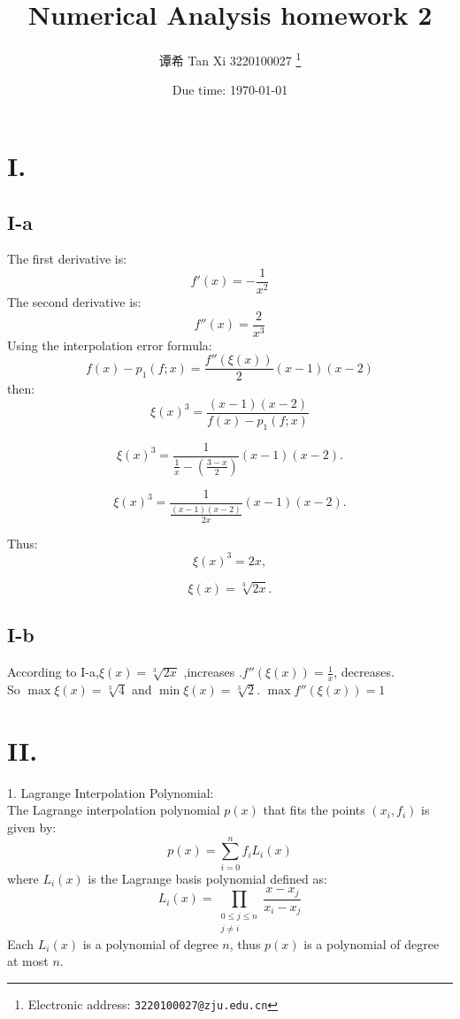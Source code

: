 \documentclass[a4paper]{article}
\begin{document}
\title{Numerical Analysis homework 2}

\author{谭希 Tan Xi 3220100027
  \thanks{Electronic address: \texttt{3220100027@zju.edu.cn}}}


\date{Due time: \today}

\maketitle

\section*{I. }
\subsection*{I-a}
The first derivative is:
\[f'(x) = -\frac{1}{x^2}\]
The second derivative is:
\[f''(x) = \frac{2}{x^3}\]
Using the interpolation error formula:
\[f(x) - p_1(f; x) = \frac{f''(\xi(x))}{2} (x - 1)(x - 2)\]
then:
\[\xi(x)^3 = \frac{(x - 1)(x - 2)}{f(x) - p_1(f; x)}\]

\[\xi(x)^3 = \frac{1}{\frac{1}{x} - \left(\frac{3 - x}{2}\right)}(x - 1)(x - 2).\]

\[\xi(x)^3 = \frac{1}{\frac{(x - 1)(x - 2)}{2x}}(x - 1)(x - 2).\]

Thus:
\[\xi(x)^3 = 2x,\]

\[\xi(x) = \sqrt[3]{2x}.\]

\subsection*{I-b}
According to I-a,$\xi(x)=\sqrt[3]{2x}$ ,increases .$f''(\xi(x))=\frac{1}{x}$, decreases.\\
So $\max\xi(x)=\sqrt[3]{4}$ and $\min\xi(x)=\sqrt[3]{2}$.
$\max f''(\xi(x))=1$

\section*{II. }

1. Lagrange Interpolation Polynomial:\\
   The Lagrange interpolation polynomial \( p(x) \) that fits the points \( (x_i, f_i) \) is given by:
   \[
   p(x) = \sum_{i=0}^{n} f_i L_i(x)
   \]
   where \( L_i(x) \) is the Lagrange basis polynomial defined as:
   \[
   L_i(x) = \prod_{\substack{0 \leq j \leq n \\ j \neq i}} \frac{x - x_j}{x_i - x_j}
   \]
   Each \( L_i(x) \) is a polynomial of degree \( n \), thus \( p(x) \) is a polynomial of degree at most \( n \).
\end{document}
